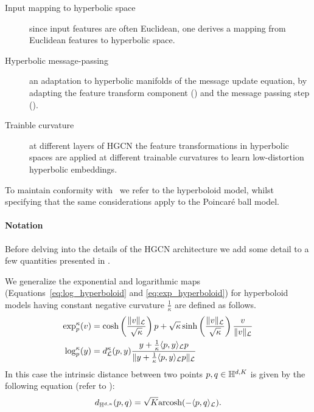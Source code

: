 \begin{description}
    \item[Input mapping to hyperbolic space] since input features are often Euclidean, one derives a mapping from Euclidean features to hyperbolic space.
    \item[Hyperbolic message-passing] an adaptation to hyperbolic manifolds of the message update equation, by adapting the feature transform component () and the message passing step ().
    \item[Trainble curvature] at different layers of HGCN the feature transformations in hyperbolic spaces are applied at different trainable curvatures to learn low-distortion hyperbolic embeddings.
\end{description}

To maintain conformity with~\cite{chami2019HGCN} we refer to the hyperboloid model, whilst specifying that the same considerations apply to the Poincaré ball model.

\paragraph{Notation}
Before delving into the details of the HGCN architecture we add some detail to a few quantities presented in . 

We generalize the exponential and logarithmic maps (Equations~\ref{eq:log_hyperboloid} and \ref{eq:exp_hyperboloid}) for hyperboloid models having constant negative curvature $\frac{1}{\kappa}$ are defined as follows.
\begin{align}
    \exp_p^\kappa(v) &= \cosh\left(\frac{\|v\|_{\mathcal{L}}}{\sqrt{\kappa}}\right)p + \sqrt{\kappa}\sinh\left(\frac{\|v\|_{\mathcal{L}}}{\sqrt{\kappa}}\right) \frac{v}{\|v\|_{\mathcal{L}}} \label{eq:expk_hyperboloid}\\
    \log_p^\kappa(y) &= d_{\mathcal{L}}^\kappa(p,y)\frac{y + \frac{1}{\kappa}\langle p,y \rangle_{\mathcal{L}}p}{\|y + \frac{1}{\kappa}\langle p,y \rangle_{\mathcal{L}}p\|_{\mathcal{L}}} \label{eq:logk_hyperboloid}
\end{align}
In this case the intrinsic distance between two points $p, q\in\mathbb{H}^{d,K}$ is given by the following equation (refer to ):
\begin{equation*}
    d_{\mathbb{H}^{d,\kappa}}(p, q) = \sqrt{K}\text{arcosh}(-\langle p, q \rangle_{\mathcal{L}}).
\end{equation*}

